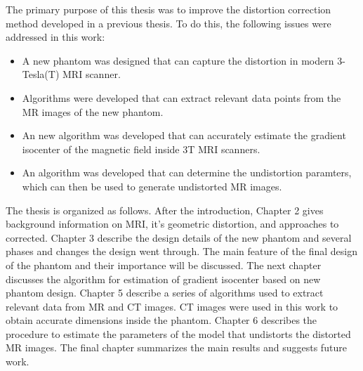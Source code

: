 
The primary purpose of this thesis was to improve the distortion correction method developed in a previous 
thesis.  To do this, the following issues were addressed in this work:
\begin{itemize}
\item A new phantom was designed that can capture the distortion in modern 3-Tesla(T) MRI scanner. 
\item Algorithms were developed that can extract relevant data points from the MR images of the new phantom.
\item An new algorithm was developed that can accurately estimate the gradient isocenter of the magnetic 
  field inside 3T MRI scanners.
\item An algorithm was developed that can determine the undistortion paramters, which can then be used to 
  generate undistorted MR images.
\end{itemize}

The thesis is organized as follows. After the introduction, Chapter 2 gives background information on MRI, 
it's geometric distortion, and approaches to corrected. 
Chapter 3 describe the design details of the new phantom and several phases and changes the design 
went through. The main feature of the final design of the phantom and their importance will be discussed.
The next chapter discusses the algorithm for estimation of  gradient isocenter based on new
phantom design. %
Chapter 5 describe a series of algorithms used to extract relevant data from MR and CT images. CT images were
used in this work to obtain accurate dimensions inside the phantom.
Chapter 6 describes the procedure to estimate the parameters of the model that undistorts the distorted 
MR images. The final chapter summarizes the main results and suggests future work.

